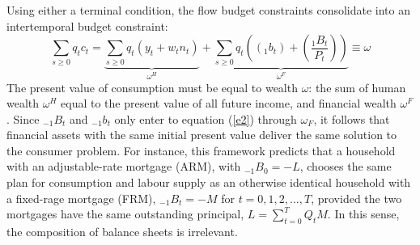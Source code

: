 \documentclass[11pt,letterpaper]{article}
\begin{document}
Using either a terminal condition, the flow budget constraints consolidate into an intertemporal budget constraint: 
\begin{equation}\label{e2}
	\sum_{s \geqslant 0}q_{t}c_{t} = \underbrace{\sum_{s \geqslant 0}q_{t}(y_{t} + w_{t}n_{t})}_{\omega^H} + \underbrace{\sum_{s \geqslant 0}q_{t}\left ( (_{1}b_{t}) + \left(\frac{_{1}B_{t}}{P_{t}}\right)\right )}_{\omega^F} \equiv \omega 
\end{equation}
The present value of consumption must be equal to wealth $\omega$: the sum of human wealth $\omega^{H}$ equal to the present value of all future income, and financial wealth $\omega^{F}$. Since $_{-1}B_{t}$ and $_{-1}b_{t}$ only enter to equation (\ref{e2}) through $\omega_{F}$, it follows that financial assets with the same initial present value deliver the same solution to the consumer problem. For instance, this framework predicts that a household with an adjustable-rate mortgage (ARM), with $_{-1}B_{0} = -L$, chooses the same plan for consumption and labour supply as an otherwise identical household with a fixed-rage mortgage (FRM), $_{-1}B_{t} = -M$ for $t = 0, 1, 2, \ldots, T$, provided the two mortgages have the same outstanding principal, $L = \sum_{t=0}^{T}Q_{t}M$. In this sense, the composition of balance sheets is irrelevant. 
\end{document}
